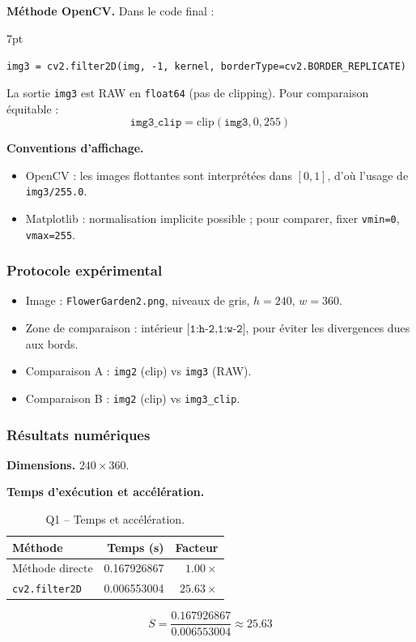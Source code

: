 \documentclass[11pt,a4paper]{article}
\newenvironment{formal}{%
\def\FrameCommand{%
  \hspace{1pt}%
  {\color{enstaBleuFonce}\vrule width 2pt}%
  {\color{formalshade}\vrule width 4pt}%
  \colorbox{formalshade}%
}%
\MakeFramed{\advance\hsize-\width\FrameRestore}%
\noindent\hspace{-4.55pt}%
\begin{adjustwidth}{}{7pt}%
\vspace{4pt}%
}{%
\vspace{4pt}\end{adjustwidth}\endMakeFramed%
}
\begin{document}
\textbf{Méthode OpenCV.} Dans le code final :
\begin{formal}
\texttt{img3 = cv2.filter2D(img, -1, kernel, borderType=cv2.BORDER\_REPLICATE)}
\end{formal}
La sortie \texttt{img3} est RAW en \texttt{float64} (pas de clipping). Pour comparaison équitable :
\[
\texttt{img3\_clip}=\mathrm{clip}(\texttt{img3},0,255)
\]

\textbf{Conventions d'affichage.}
\begin{itemize}[leftmargin=1.5em]
  \item OpenCV : les images flottantes sont interprétées dans \([0,1]\), d'où l'usage de \texttt{img3/255.0}.
  \item Matplotlib : normalisation implicite possible ; pour comparer, fixer \texttt{vmin=0}, \texttt{vmax=255}.
\end{itemize}

\subsubsection{Protocole expérimental}
\begin{itemize}[leftmargin=1.5em]
  \item Image : \texttt{FlowerGarden2.png}, niveaux de gris, \(h=240\), \(w=360\).
  \item Zone de comparaison : intérieur \(\texttt{[1:h-2,1:w-2]}\), pour éviter les divergences dues aux bords.
  \item Comparaison A : \texttt{img2} (clip) vs \texttt{img3} (RAW).
  \item Comparaison B : \texttt{img2} (clip) vs \texttt{img3\_clip}.
\end{itemize}

\subsubsection{Résultats numériques}
\textbf{Dimensions.} \(240 \times 360\).

\textbf{Temps d'exécution et accélération.}
\begin{table}[H]
  \centering
  \caption{Q1 -- Temps et accélération.}
  \label{tab:q1-temps}
  \begin{tabular}{@{}lrr@{}}
    \toprule
    Méthode & Temps (s) & Facteur \\
    \midrule
    Méthode directe & 0.167926867 & \(1.00\times\) \\
    \texttt{cv2.filter2D} & 0.006553004 & \(25.63\times\) \\
    \bottomrule
  \end{tabular}
\end{table}
\[
S=\frac{0.167926867}{0.006553004}\approx 25.63
\]
\end{document}
